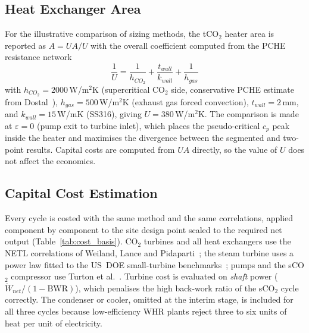 \subsection{Heat Exchanger Area}

For the illustrative comparison of sizing methods, the tCO$_2$ heater area is
reported as $A = UA/U$ with the overall coefficient computed from the PCHE
resistance network
\begin{equation}
\frac{1}{U} = \frac{1}{h_{CO_2}} + \frac{t_{wall}}{k_{wall}} + \frac{1}{h_{gas}}
\label{eq:U_overall}
\end{equation}
with $h_{CO_2} = 2000$\,W/m$^2$K (supercritical CO$_2$ side, conservative
PCHE estimate from Dostal~\cite{Dostal2004}), $h_{gas} = 500$\,W/m$^2$K
(exhaust gas forced convection), $t_{wall} = 2$\,mm, and $k_{wall} =
15$\,W/mK (SS316), giving $U = 380$\,W/m$^2$K. The comparison is made at
$\varepsilon = 0$ (pump exit to turbine inlet), which places the
pseudo-critical $c_p$ peak inside the heater and maximises the divergence
between the segmented and two-point results. Capital costs are computed from
$UA$ directly, so the value of $U$ does not affect the economics.

\subsection{Capital Cost Estimation}
\label{sec:method_cost}

Every cycle is costed with the same method and the same correlations, applied
component by component to the site design point scaled to the required net
output (Table~\ref{tab:cost_basis}). CO$_2$ turbines and all heat exchangers
use the NETL correlations of Weiland, Lance and Pidaparti~\cite{Weiland2019};
the steam turbine uses a power law fitted to the US~DOE small-turbine
benchmarks~\cite{DOE2012}; pumps and the sCO$_2$ compressor use Turton et
al.~\cite{Turton2012}. Turbine cost is evaluated on \emph{shaft} power
($\dot{W}_{net}/(1-\mathrm{BWR})$), which penalises the high back-work ratio
of the sCO$_2$ cycle correctly. The condenser or cooler, omitted at the
interim stage, is included for all three cycles because low-efficiency WHR
plants reject three to six units of heat per unit of electricity.

